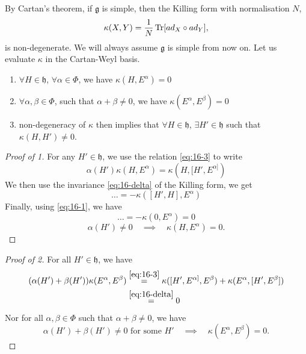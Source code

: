 By Cartan's theorem, if $\mathfrak{g}$ is simple, then the Killing form with normalisation $N$,
\begin{equation}
  \label{eq:16-4}
  \kappa(X, Y) = \frac{1}{N} \Tr[ad_X \circ ad_Y],
\end{equation}
is non-degenerate.
We will always assume $\mathfrak{g}$ is simple from now on.
Let us evaluate $\kappa$ in the Cartan-Weyl basis.
\begin{claim}
  \begin{enumerate}
    \item $\forall H \in \mathfrak{h}$, $\forall \alpha \in \Phi$, we have $\kappa(H, E^{\alpha}) = 0$
    \item $\forall \alpha, \beta \in \Phi$, such that $\alpha + \beta \neq 0$, we have $\kappa(E^{\alpha}, E^{\beta}) =0$
    \item non-degeneracy of $\kappa$ then implies that $\forall H \in \mathfrak{h}$, $\exists H' \in \mathfrak{h}$ such that $\kappa(H, H') \neq 0$.
  \end{enumerate}
\end{claim}
\begin{proof}[Proof of 1]
  \item For any $H' \in \mathfrak{h}$, we use the relation \eqref{eq:16-3} to write
    \begin{equation}
      \alpha(H') \kappa(H, E^{\alpha}) = \kappa(H, [H', E^{\alpha]})
    \end{equation}
    We then use the invariance \eqref{eq:16-delta} of the Killing form, we get
    \begin{equation}
      \dots = -\kappa ([H', H], E^{\alpha})
    \end{equation}
    Finally, using \eqref{eq:16-1}, we have
    \begin{equation}
      \dots = -\kappa (0, E^{\alpha}) = 0
    \end{equation}
    \begin{equation}
      \alpha(H') \neq 0 \quad \implies \quad \kappa(H, E^{\alpha}) = 0.
    \end{equation}
\end{proof}
\begin{proof}[Proof of 2]
  For all $H' \in \mathfrak{h}$, we have
  \begin{align}
    (\alpha(H') + \beta(H')) \kappa(E^{\alpha}, E^{\beta}) &\stackrel{\eqref{eq:16-3}}{=} \kappa([H', E^{\alpha]}, E^{\beta}) + \kappa(E^{\alpha}, [H', E^{\beta}]) \\
							   &\stackrel{\eqref{eq:16-delta}}{=} 0
  \end{align}
  Nor for all $\alpha,\beta \in \Phi$ such that $\alpha + \beta \neq 0$, we have 
  \begin{equation}
    \alpha(H') + \beta(H') \neq 0 \text{ for some } H' \quad \implies \quad \kappa(E^{\alpha}, E^{\beta}) = 0.
  \end{equation}
\end{proof}
